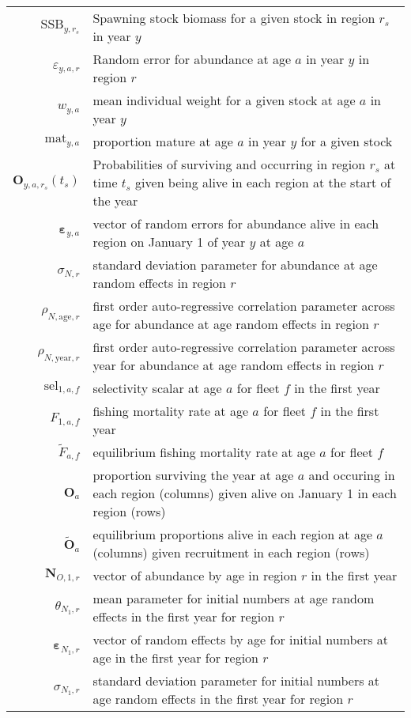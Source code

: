 \begin{longtable}[c]{r p{}}
$\text{SSB}_{y,r_s}$ & Spawning stock biomass for a given stock in region $r_s$ in year $y$\\
$\varepsilon_{y,a,r}$ & Random error for abundance at age $a$ in year $y$ in region $r$\\
$w_{y,a}$ & mean individual weight for a given stock at age $a$ in year $y$\\
$\text{mat}_{y,a}$ & proportion mature at age $a$ in year $y$ for a given stock\\
$\mathbf{O}_{y,a,r_s}(t_s)$ & Probabilities of surviving and occurring in region $r_s$ at time $t_s$ given being alive in each region at the start of the year\\
$\boldsymbol{\varepsilon}_{y,a}$ & vector of random errors for abundance alive in each region on January 1 of year $y$ at age $a$\\
$\sigma_{N,r}$ & standard deviation parameter for abundance at age random effects in region $r$\\
$\rho_{N,\text{age},r}$ & first order auto-regressive correlation parameter across age for abundance at age random effects in region $r$\\
$\rho_{N,\text{year},r}$ & first order auto-regressive correlation parameter across year for abundance at age random effects in region $r$\\
$\text{sel}_{1,a,f}$ & selectivity scalar at age $a$ for fleet $f$ in the first year\\
$F_{1,a,f}$ & fishing mortality rate at age $a$ for fleet $f$ in the first year\\
$\widetilde{F}_{a,f}$ & equilibrium fishing mortality rate at age $a$ for fleet $f$\\
$\mathbf{O}_{a}$ & proportion surviving the year at age $a$ and occuring in each region (columns) given alive on January 1 in each region (rows)\\
$\widetilde{\mathbf{O}}_{a}$ & equilibrium proportions alive in each region at age $a$ (columns) given recruitment in each region (rows)\\
$\mathbf{N}_{O,1,r}$ & vector of abundance by age in region $r$ in the first year\\
$\theta_{N_1,r}$ & mean parameter for initial numbers at age random effects in the first year for region $r$\\
$\boldsymbol{\varepsilon}_{N_1,r}$ & vector of random effects by age for initial numbers at age in the first year for region $r$\\ 
$\sigma_{N_1,r}$ & standard deviation parameter for initial numbers at age random effects in the first year for region $r$\\

\end{longtable}
